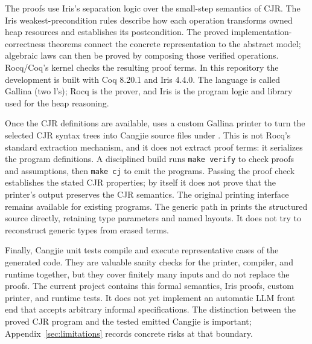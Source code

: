 \documentclass[11pt]{article}
\begin{document}
The proofs use Iris's separation logic over the small-step semantics of CJR.
The Iris weakest-precondition rules describe how each operation transforms
owned heap resources and establishes its postcondition.  The proved
implementation-correctness theorems connect the concrete representation to
the abstract model; algebraic laws can then be proved by composing those
verified operations.  Rocq/Coq's kernel checks the resulting proof terms.
In this repository the development is built with Coq 8.20.1 and Iris 4.4.0.
The language is called Gallina (two l's); Rocq is the prover, and Iris is the
program logic and library used for the heap reasoning.

Once the CJR definitions are available, 
uses a custom Gallina printer to turn the selected CJR syntax trees into
Cangjie source files under .  This is not Rocq's
standard extraction mechanism, and it does not extract proof terms: it
serializes the program definitions.  A disciplined build runs
\texttt{make verify} to check proofs and assumptions, then \texttt{make cj}
to emit the programs.  Passing the proof check establishes the stated CJR
properties; by itself it does not prove that the printer's output preserves
the CJR semantics.
The original printing interface remains available for existing programs.
The generic path in  prints the
structured source directly, retaining type parameters and named layouts.
It does not try to reconstruct generic types from erased terms.

Finally, Cangjie unit tests compile and execute representative cases of the
generated code.  They are valuable sanity checks for the printer, compiler,
and runtime together, but they cover finitely many inputs and do not replace
the proofs.  The current project contains this formal semantics, Iris
proofs, custom printer, and runtime tests.  It does not yet implement an
automatic LLM front end that accepts arbitrary informal specifications.
The distinction between the proved CJR program and the tested emitted
Cangjie is important; Appendix~\ref{sec:limitations} records concrete risks
at that boundary.
\end{document}
